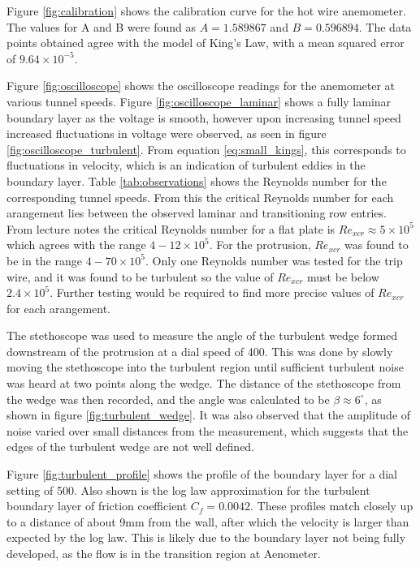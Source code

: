 \documentclass{article}
\begin{document}

Figure \ref{fig:calibration} shows the calibration curve for the hot wire anemometer.
The values for A and B were found as $A	= 1.589867$ and $B	= 0.596894$.
The data points obtained agree with the model of King's Law, with a mean squared error of $9.64\times 10^{-5}$.


Figure \ref{fig:oscilloscope} shows the oscilloscope readings for the anemometer at various tunnel speeds.
Figure \ref{fig:oscilloscope_laminar} shows a fully laminar boundary layer as the voltage is smooth, 
however upon increasing tunnel speed increased fluctuations in voltage were observed, as seen in figure \ref{fig:oscilloscope_turbulent}.
From equation \ref{eq:small_kings}, this corresponds to fluctuations in velocity, which is an indication of turbulent eddies in the boundary layer.
Table \ref{tab:observations} shows the Reynolds number for the corresponding tunnel speeds.
From this the critical Reynolds number for each arangement lies between the observed laminar and transitioning row entries.
From lecture notes the critical Reynolds number for a flat plate is $Re_{xcr} \approx 5 \times 10^5$ \cite{notes} which agrees with the range $4-12 \times 10^5$.
For the protrusion, $Re_{xcr}$ was found to be in the range $4-70 \times 10^5$.
Only one Reynolds number was tested for the trip wire, and it was found to be turbulent so the value of $Re_{xcr}$ must be below $2.4\times 10^5$.
Further testing would be required to find more precise values of $Re_{xcr}$ for each arangement.

The stethoscope was used to measure the angle of the turbulent wedge formed downstream of the protrusion at a dial speed of 400.
This was done by slowly moving the stethoscope into the turbulent region until sufficient turbulent noise was heard at two points along the wedge.
The distance of the stethoscope from the wedge was then recorded, and the angle was calculated to be $\beta \approx 6^\circ$, as shown in figure \ref{fig:turbulent_wedge}.
It was also observed that the amplitude of noise varied over small distances from the measurement, which suggests that the edges of the turbulent wedge
are not well defined.


Figure \ref{fig:turbulent_profile} shows the profile of the boundary layer for a dial setting of 500.
Also shown is the log law approximation for the turbulent boundary layer of friction coefficient $C_f = 0.0042$.
These profiles match closely up to a distance of about 9mm from the wall, after which the velocity is larger than expected by the log law.
This is likely due to the boundary layer not being fully developed, as the flow is in the transition region at Aenometer.
\end{document}
